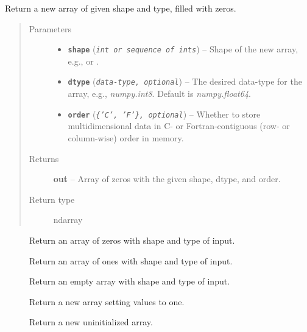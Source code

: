 \documentclass[letterpaper,10pt,english]{sphinxmanual}
\begin{document}
\begin{fulllineitems}
\label{docstring_examples:abc_pack.docstring_examples.numpy_style}
Return a new array of given shape and type, filled with zeros.
\begin{quote}\begin{description}
\item[{Parameters}] \leavevmode\begin{itemize}
\item {} 
\textbf{\texttt{shape}} (\emph{\texttt{int or sequence of ints}}) -- Shape of the new array, e.g.,  or .

\item {} 
\textbf{\texttt{dtype}} (\emph{\texttt{data-type, optional}}) -- The desired data-type for the array, e.g., \emph{numpy.int8}.  Default is
\emph{numpy.float64}.

\item {} 
\textbf{\texttt{order}} (\emph{\texttt{\{'C', 'F'\}, optional}}) -- Whether to store multidimensional data in C- or Fortran-contiguous
(row- or column-wise) order in memory.

\end{itemize}

\item[{Returns}] \leavevmode
\textbf{out} --
Array of zeros with the given shape, dtype, and order.

\item[{Return type}] \leavevmode
ndarray

\end{description}\end{quote}



\begin{description}
\item[{}] \leavevmode
Return an array of zeros with shape and type of input.

\item[{}] \leavevmode
Return an array of ones with shape and type of input.

\item[{}] \leavevmode
Return an empty array with shape and type of input.

\item[{}] \leavevmode
Return a new array setting values to one.

\item[{}] \leavevmode
Return a new uninitialized array.


\end{description}
\end{fulllineitems}
\end{document}
